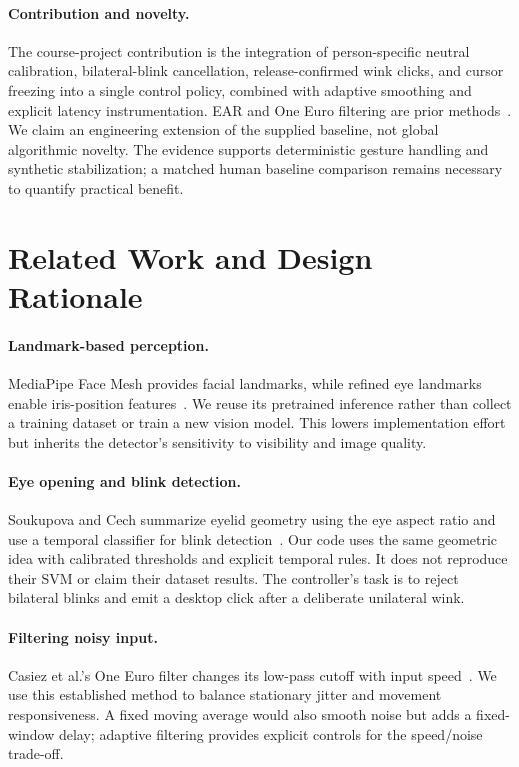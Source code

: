 \documentclass[10pt,twocolumn,letterpaper]{article}
\begin{document}
\paragraph{Contribution and novelty.} The course-project contribution is the integration of person-specific neutral calibration, bilateral-blink cancellation, release-confirmed wink clicks, and cursor freezing into a single control policy, combined with adaptive smoothing and explicit latency instrumentation. EAR and One Euro filtering are prior methods~\cite{ear,euro}. We claim an engineering extension of the supplied baseline, not global algorithmic novelty. The evidence supports deterministic gesture handling and synthetic stabilization; a matched human baseline comparison remains necessary to quantify practical benefit.

\section{Related Work and Design Rationale}
\paragraph{Landmark-based perception.} MediaPipe Face Mesh provides facial landmarks, while refined eye landmarks enable iris-position features~\cite{mesh,iris}. We reuse its pretrained inference rather than collect a training dataset or train a new vision model. This lowers implementation effort but inherits the detector's sensitivity to visibility and image quality.

\paragraph{Eye opening and blink detection.} Soukupova and Cech summarize eyelid geometry using the eye aspect ratio and use a temporal classifier for blink detection~\cite{ear}. Our code uses the same geometric idea with calibrated thresholds and explicit temporal rules. It does not reproduce their SVM or claim their dataset results. The controller's task is to reject bilateral blinks and emit a desktop click after a deliberate unilateral wink.

\paragraph{Filtering noisy input.} Casiez et al.'s One Euro filter changes its low-pass cutoff with input speed~\cite{euro}. We use this established method to balance stationary jitter and movement responsiveness. A fixed moving average would also smooth noise but adds a fixed-window delay; adaptive filtering provides explicit controls for the speed/noise trade-off.
\end{document}
